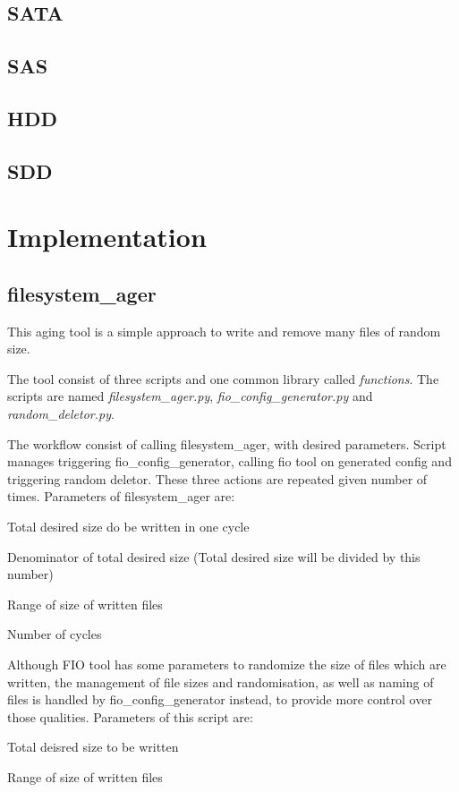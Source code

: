 \documentclass[
  color, %
  table, %
  lof,   %
  lot,   %
]{fithesis3}
\begin{document}
\section{SATA}
\section{SAS}
\section{HDD}
\section{SDD}
\chapter{Implementation}
\section{filesystem\_ager}
This aging tool is a simple approach to write and remove many files of random size.

The tool consist of three scripts and one common library called \textit{functions}. The scripts are named \textit{filesystem\_ager.py}, \textit{fio\_config\_generator.py} and \textit{random\_deletor.py}.

The workflow consist of calling filesystem\_ager, with desired parameters. Script manages triggering fio\_config\_generator, calling fio tool on generated config and triggering random deletor. These three actions are repeated given number of times.
Parameters of filesystem\_ager are: 
\begin{compactenum}
  \item Total desired size do be written in one cycle
  \item Denominator of total desired size (Total desired size will be divided by this number)
  \item Range of size of written files
  \item Number of cycles
\end{compactenum}

Although FIO tool has some parameters to randomize the size of files which are written, the management of file sizes and randomisation, as well as naming of files is handled by fio\_config\_generator instead, to provide more control over those qualities.
Parameters of this script are:
\begin{compactenum}
  \item Total deisred size to be written
  \item Range of size of written files
\end{compactenum}
\end{document}
